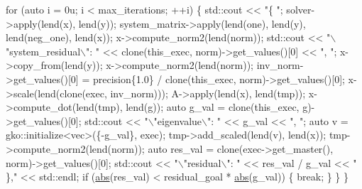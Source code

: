 \begin{DoxyCodeInclude}
    \textcolor{keywordflow}{for} (\textcolor{keyword}{auto} i = 0u; i < max\_iterations; ++i) \{
        std::cout << \textcolor{stringliteral}{"\{ "};
        solver->apply(lend(x), lend(y));
        system\_matrix->apply(lend(one), lend(y), lend(neg\_one), lend(x));
        x->compute\_norm2(lend(norm));
        std::cout << \textcolor{stringliteral}{"\(\backslash\)"system\_residual\(\backslash\)": "}
                  << clone(this\_exec, norm)->get\_values()[0] << \textcolor{stringliteral}{", "};
        x->copy\_from(lend(y));
        x->compute\_norm2(lend(norm));
        inv\_norm->get\_values()[0] =
            precision\{1.0\} / clone(this\_exec, norm)->get\_values()[0];
        x->scale(lend(clone(exec, inv\_norm)));
        A->apply(lend(x), lend(tmp));
        x->compute\_dot(lend(tmp), lend(g));
        \textcolor{keyword}{auto} g\_val = clone(this\_exec, g)->get\_values()[0];
        std::cout << \textcolor{stringliteral}{"\(\backslash\)"eigenvalue\(\backslash\)": "} << g\_val << \textcolor{stringliteral}{", "};
        \textcolor{keyword}{auto} v = gko::initialize<vec>(\{-g\_val\}, exec);
        tmp->add\_scaled(lend(v), lend(x));
        tmp->compute\_norm2(lend(norm));
        \textcolor{keyword}{auto} res\_val = clone(exec->get\_master(), norm)->get\_values()[0];
        std::cout << \textcolor{stringliteral}{"\(\backslash\)"residual\(\backslash\)": "} << res\_val / g\_val << \textcolor{stringliteral}{" \},"} << std::endl;
        \textcolor{keywordflow}{if} (\hyperlink{namespacegko_a57797fc0a00fd4b7ff34ca4bfc84bc51}{abs}(res\_val) < residual\_goal * \hyperlink{namespacegko_a57797fc0a00fd4b7ff34ca4bfc84bc51}{abs}(g\_val)) \{
            \textcolor{keywordflow}{break};
        \}
    \}
\}
\end{DoxyCodeInclude}
 